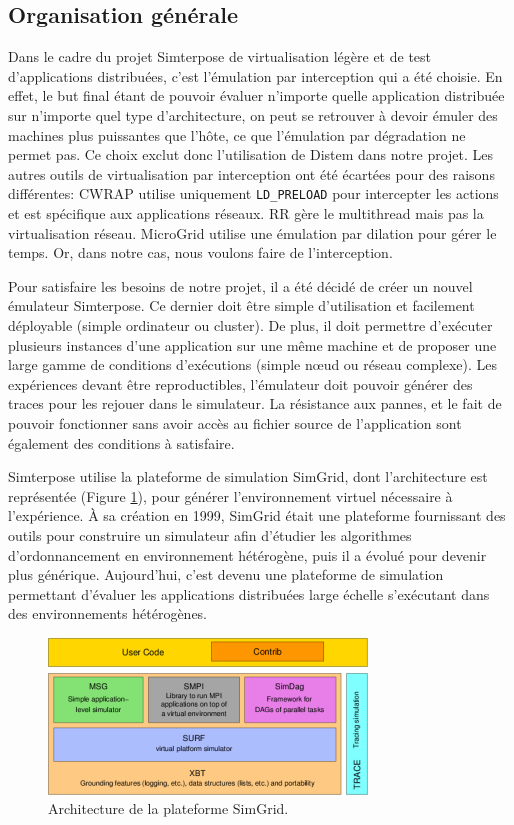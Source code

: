\subsection{Organisation générale}

Dans le cadre du projet Simterpose de virtualisation légère et de test
d'applications distribuées, c'est l'émulation par interception qui a été
choisie. En effet, le but final étant de pouvoir évaluer n'importe quelle
application distribuée sur n'importe quel type d'architecture, on peut se
retrouver à devoir émuler des machines plus puissantes que l'hôte, ce que
l'émulation par dégradation ne permet pas. Ce choix exclut donc l'utilisation de
Distem dans notre projet. Les autres outils de virtualisation par interception
ont été écartées pour des raisons différentes: CWRAP utilise uniquement
\texttt{LD\_PRELOAD} pour intercepter les actions et est spécifique aux
applications réseaux. RR gère le multithread mais pas la virtualisation réseau. MicroGrid utilise une émulation par dilation pour gérer le temps. Or, dans notre cas, nous voulons faire de l'interception.

Pour satisfaire les besoins de notre projet, il a été décidé de créer un nouvel
émulateur Simterpose. Ce dernier doit être simple d'utilisation et facilement
déployable (simple ordinateur ou cluster).  De plus, il doit permettre
d'exécuter plusieurs instances d'une application sur une même machine et de proposer une large gamme de conditions d'exécutions (simple n\oe ud ou réseau
complexe). Les expériences devant être reproductibles, l'émulateur doit pouvoir
générer des traces pour les rejouer dans le simulateur. La résistance aux
pannes, et le fait de pouvoir fonctionner sans avoir accès au fichier source de
l'application sont également des conditions à satisfaire.

Simterpose utilise la plateforme de simulation SimGrid, dont l'architecture
est représentée (Figure \ref{SimGrid}), pour générer l'environnement virtuel
nécessaire à l'expérience. À sa création en 1999, SimGrid
\citep{CASANOVA:SimGrid} était une plateforme fournissant des outils pour
construire un simulateur afin d'étudier les algorithmes d'ordonnancement en
environnement hétérogène, puis il a évolué \citep{MARTIN:SimGrid} pour devenir
plus générique. Aujourd'hui, c'est devenu une plateforme de simulation
permettant d'évaluer les applications distribuées large échelle s'exécutant dans
des environnements hétérogènes.
 
\begin{figure}[H]
  \centering
  \includegraphics[scale=0.86]{Pictures/png/SimGrid}
  \caption{Architecture de la plateforme SimGrid.}
  \label{SimGrid}
\end{figure}

